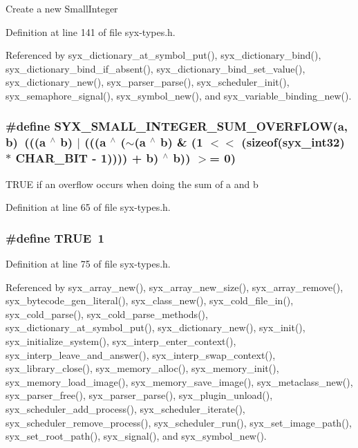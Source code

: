 Create a new SmallInteger 

Definition at line 141 of file syx-types.h.

Referenced by syx\_\-dictionary\_\-at\_\-symbol\_\-put(), syx\_\-dictionary\_\-bind(), syx\_\-dictionary\_\-bind\_\-if\_\-absent(), syx\_\-dictionary\_\-bind\_\-set\_\-value(), syx\_\-dictionary\_\-new(), syx\_\-parser\_\-parse(), syx\_\-scheduler\_\-init(), syx\_\-semaphore\_\-signal(), syx\_\-symbol\_\-new(), and syx\_\-variable\_\-binding\_\-new().\hypertarget{syx-types_8h_4e849ad177c1b33faf9d4c5719361f77}{
\subsubsection{\setlength{\rightskip}{0pt plus 5cm}\#define SYX\_\-SMALL\_\-INTEGER\_\-SUM\_\-OVERFLOW(a, \/  b)~(((a $^\wedge$ b) $|$ (((a $^\wedge$ ($\sim$(a $^\wedge$ b) \& (1 $<$$<$ (sizeof({\bf syx\_\-int32}) $\ast$ CHAR\_\-BIT - 1)))) + b) $^\wedge$ b)) $>$= 0)}}
\label{syx-types_8h_4e849ad177c1b33faf9d4c5719361f77}


TRUE if an overflow occurs when doing the sum of a and b 

Definition at line 65 of file syx-types.h.\hypertarget{syx-types_8h_a8cecfc5c5c054d2875c03e77b7be15d}{
\subsubsection{\setlength{\rightskip}{0pt plus 5cm}\#define TRUE~1}}
\label{syx-types_8h_a8cecfc5c5c054d2875c03e77b7be15d}




Definition at line 75 of file syx-types.h.

Referenced by syx\_\-array\_\-new(), syx\_\-array\_\-new\_\-size(), syx\_\-array\_\-remove(), syx\_\-bytecode\_\-gen\_\-literal(), syx\_\-class\_\-new(), syx\_\-cold\_\-file\_\-in(), syx\_\-cold\_\-parse(), syx\_\-cold\_\-parse\_\-methods(), syx\_\-dictionary\_\-at\_\-symbol\_\-put(), syx\_\-dictionary\_\-new(), syx\_\-init(), syx\_\-initialize\_\-system(), syx\_\-interp\_\-enter\_\-context(), syx\_\-interp\_\-leave\_\-and\_\-answer(), syx\_\-interp\_\-swap\_\-context(), syx\_\-library\_\-close(), syx\_\-memory\_\-alloc(), syx\_\-memory\_\-init(), syx\_\-memory\_\-load\_\-image(), syx\_\-memory\_\-save\_\-image(), syx\_\-metaclass\_\-new(), syx\_\-parser\_\-free(), syx\_\-parser\_\-parse(), syx\_\-plugin\_\-unload(), syx\_\-scheduler\_\-add\_\-process(), syx\_\-scheduler\_\-iterate(), syx\_\-scheduler\_\-remove\_\-process(), syx\_\-scheduler\_\-run(), syx\_\-set\_\-image\_\-path(), syx\_\-set\_\-root\_\-path(), syx\_\-signal(), and syx\_\-symbol\_\-new().

